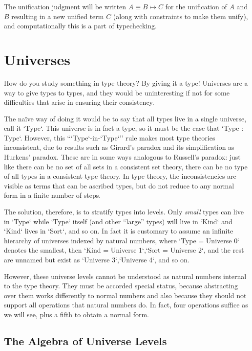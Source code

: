 \documentclass[11pt, twoside, reqno]{book}
\begin{document}
The unification judgment will be written \(A \equiv B \mapsto C\) for the unification of \(A\) and \(B\) resulting in a new unified term \(C\) (along with constraints to make them unify), and computationally this is a part of typechecking.

\chapter{Universes}
\label{universes}

How do you study something in type theory?
By giving it a type!
Universes are a way to give types to types, and they would be uninteresting if not for some difficulties that arise in ensuring their consistency.

The na\" ive way of doing it would be to say that all types live in a single universe, call it \inHS`Type`.
This universe is in fact a type, so it must be the case that \inHS`Type : Type`.
However, this ``\inHS`Type`-in-\inHS`Type`'' rule makes most type theories inconsistent, due to results such as Girard's paradox and its simplification as Hurkens' paradox.
These are in some ways analogous to Russell's paradox: just like there can be no set of all sets in a consistent set theory, there can be no type of all types in a consistent type theory.
In type theory, the inconsistencies are visible as terms that can be ascribed types, but do not reduce to any normal form in a finite number of steps.

The solution, therefore, is to stratify types into levels.
Only \emph{small} types can live in \inHS`Type` while \inHS`Type` itself (and other ``large'' types) will live in \inHS`Kind` and \inHS`Kind` lives in \inHS`Sort`, and so on.
In fact it is customary to assume an infinite hierarchy of universes indexed by natural numbers, where \inHS`Type = Universe 0` denotes the smallest, then \inHS`Kind = Universe 1`,\enskip\inHS`Sort = Universe 2`, and the rest are unnamed but exist as \inHS`Universe 3`,\enskip\inHS`Universe 4`, and so on.

However, these universe levels cannot be understood as natural numbers internal to the type theory.
They must be accorded special status, because abstracting over them works differently to normal numbers and also because they should not support all operations that natural numbers do.
In fact, four operations suffice as we will see, plus a fifth to obtain a normal form.

\section{The Algebra of Universe Levels}
\label{alg-uni-lvl}
\end{document}
